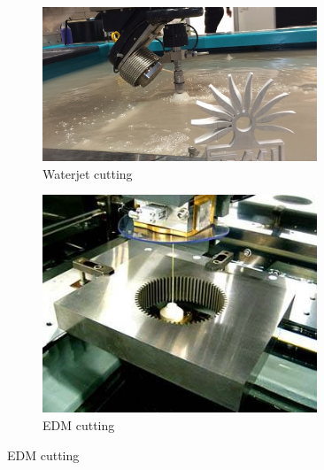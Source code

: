 \documentclass[10pt,letterpaper]{book}
\begin{document}
\begin{figure}[H]
\begin{subfigure}[b]{.24\linewidth}
		\end{subfigure}\begin{subfigure}[b]{.24\linewidth}
			\includegraphics[width=0.9\textwidth]{imgs/waterjet.jpeg}
			\caption{Waterjet cutting}
		\end{subfigure}\begin{subfigure}[b]{.24\linewidth}
			\includegraphics[width=0.9\textwidth]{imgs/edm.jpeg}
			\caption{EDM cutting}
		\end{subfigure}
	\end{figure}
 
\end{document}
